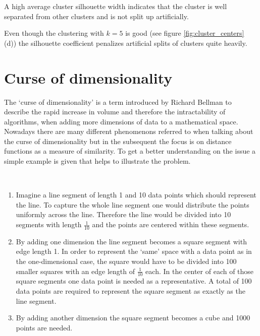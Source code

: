 \begin{remark}
A high average cluster silhouette width indicates that the cluster is well separated from other clusters and is not split up artificially. 
\end{remark}
\begin{remark}
Even though the clustering with $k=5$ is good (see figure \ref{fig:cluster_centers} (d)) the silhouette coefficient penalizes artificial splits of clusters quite heavily. 
\end{remark}

\section{Curse of dimensionality}
The `curse of dimensionality' is a term introduced by Richard Bellman \cite{bellman1961adaptive} to describe the rapid increase in volume and therefore the intractability of algorithms, when adding more dimensions of data to a mathematical space. Nowadays there are many different phenomenons referred to when talking about the curse of dimensionality but in the subsequent the focus is on distance functions as a measure of similarity. To get a better understanding on the issue a simple example is given that helps to illustrate the problem.

\begin{example}\label{ex:curse_of_dimensionality}~
	\begin{enumerate}[label=(\roman*)]
		\item Imagine a line segment of length 1 and 10 data points which should represent the line. To capture the whole line segment one would distribute the points uniformly across the line. Therefore the line would be divided into 10 segments with length $\frac{1}{10}$ and the points are centered within these segments.
		\item By adding one dimension the line segment becomes a square segment with edge length 1. In order to represent the `same' space with a data point as in the one-dimensional case, the square would have to be divided into 100 smaller squares with an edge length of $\frac{1}{10}$ each. In the center of each of those square segments one data point is needed as a representative. A total of 100 data points are required to represent the square segment as exactly as the line segment. 
		\item By adding another dimension the square segment becomes a cube and 1000 points are needed. 
	\end{enumerate}
\end{example}

